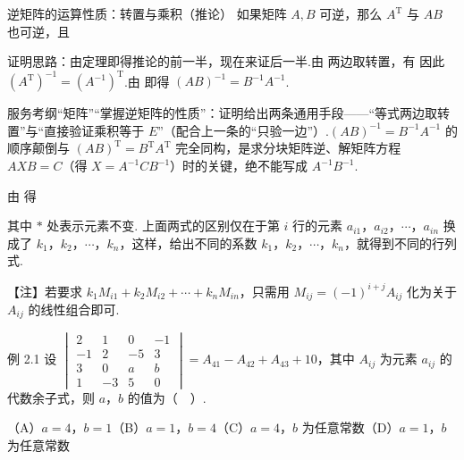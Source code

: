 \begin{fdeep}{逆矩阵的运算性质：转置与乘积（推论）}
\quad 如果矩阵 $A,B$ 可逆，那么 $A^{\mathrm{T}}$ 与 $AB$ 也可逆，且

证明思路：由定理即得推论的前一半，现在来证后一半.由
两边取转置，有
因此 $(A^{\mathrm{T}})^{-1}=(A^{-1})^{\mathrm{T}}$.由
即得 $(AB)^{-1}=B^{-1}A^{-1}$.

\fbref{}服务考纲“矩阵”“掌握逆矩阵的性质”：证明给出两条通用手段——“等式两边取转置”与“直接验证乘积等于 $E$”（配合上一条的“只验一边”）.$(AB)^{-1}=B^{-1}A^{-1}$ 的顺序颠倒与 $(AB)^{\mathrm{T}}=B^{\mathrm{T}}A^{\mathrm{T}}$ 完全同构，是求分块矩阵逆、解矩阵方程 $AXB=C$（得 $X=A^{-1}CB^{-1}$）时的关键，绝不能写成 $A^{-1}B^{-1}$.
\end{fdeep}


由
得

其中 $*$ 处表示元素不变. 上面两式的区别仅在于第 $i$ 行的元素 $a_{i1}$，$a_{i2}$，$\cdots$，$a_{in}$ 换成了 $k_1$，$k_2$，$\cdots$，$k_n$，这样，给出不同的系数 $k_1$，$k_2$，$\cdots$，$k_n$，就得到不同的行列式.

\begin{fnote}
【注】若要求 $k_1M_{i1}+k_2M_{i2}+\cdots+k_nM_{in}$，只需用 $M_{ij}=(-1)^{i+j}A_{ij}$ 化为关于 $A_{ij}$ 的线性组合即可.
\end{fnote}

\begin{fcard}{例 2.1}
设 $\begin{vmatrix}2&1&0&-1\\-1&2&-5&3\\3&0&a&b\\1&-3&5&0\end{vmatrix}=A_{41}-A_{42}+A_{43}+10$，其中 $A_{ij}$ 为元素 $a_{ij}$ 的代数余子式，则 $a$，$b$ 的值为（　）.

（A）$a=4$，$b=1$\qquad（B）$a=1$，$b=4$\qquad（C）$a=4$，$b$ 为任意常数\qquad（D）$a=1$，$b$ 为任意常数
\end{fcard}

